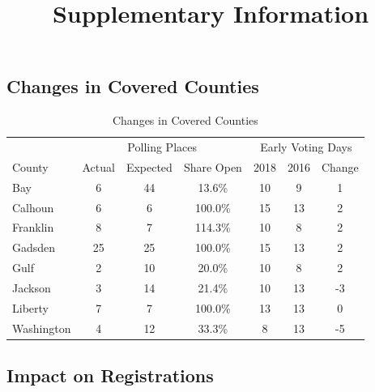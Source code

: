 \documentclass[
  12pt,
]{article}
\title{Supplementary Information}
\author{}
\date{\vspace{-2.5em}}
\begin{document}
\maketitle

{
\setcounter{tocdepth}{2}
\tableofcontents
}
\newpage
\doublespacing
\setcounter{table}{0}  \renewcommand{\thetable}{A\arabic{table}} \setcounter{figure}{0} \renewcommand{\thefigure}{A\arabic{figure}}
\newpage

\hypertarget{changes-in-covered-counties}{%
\subsection*{Changes in Covered Counties}\label{changes-in-covered-counties}}

\begin{singlespace}
\begin{table}[H]

\caption{\label{tab:change-tab}\label{tab:table-changes} Changes in Covered Counties}
\centering
\begin{tabular}[t]{lcccccc}
\toprule
\multicolumn{1}{c}{ } & \multicolumn{3}{c}{Polling Places} & \multicolumn{3}{c}{Early Voting Days} \\
\cmidrule(l{3pt}r{3pt}){2-4} \cmidrule(l{3pt}r{3pt}){5-7}
County & Actual & Expected & Share Open & 2018 & 2016 & Change\\
\midrule
Bay & 6 & 44 & 13.6\% & 10 & 9 & 1\\
Calhoun & 6 & 6 & 100.0\% & 15 & 13 & 2\\
Franklin & 8 & 7 & 114.3\% & 10 & 8 & 2\\
Gadsden & 25 & 25 & 100.0\% & 15 & 13 & 2\\
Gulf & 2 & 10 & 20.0\% & 10 & 8 & 2\\
Jackson & 3 & 14 & 21.4\% & 10 & 13 & -3\\
Liberty & 7 & 7 & 100.0\% & 13 & 13 & 0\\
Washington & 4 & 12 & 33.3\% & 8 & 13 & -5\\
\bottomrule
\end{tabular}
\end{table}
\end{singlespace}

\hypertarget{impact-on-registrations}{%
\subsection*{Impact on Registrations}\label{impact-on-registrations}}
\end{document}
